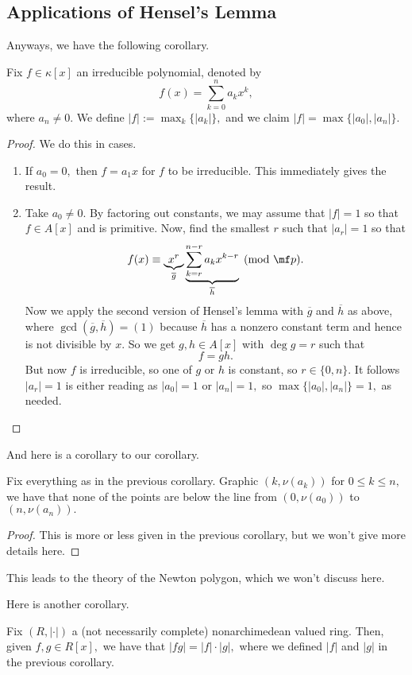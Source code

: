 \subsection{Applications of Hensel's Lemma}
Anyways, we have the following corollary.
\begin{corollary}
	Fix $f\in\kappa[x]$ an irreducible polynomial, denoted by
	\[f(x)=\sum_{k=0}^na_kx^k,\]
	where $a_n\ne0.$ We define $|f|:=\max_k\{|a_k|\},$ and we claim $|f|=\max\{|a_0|,|a_n|\}.$
\end{corollary}
\begin{proof}
	We do this in cases.
	\begin{enumerate}[label=(\roman*)]
		\item If $a_0=0,$ then $f=a_1x$ for $f$ to be irreducible. This immediately gives the result.
		\item Take $a_0\ne0.$ By factoring out constants, we may assume that $|f|=1$ so that $f\in A[x]$ and is primitive. Now, find the smallest $r$ such that $|a_r|=1$ so that
		\[f(x)\equiv \underbrace{x^r}_{\overline g}\underbrace{\sum_{k=r}^{n-r}a_kx^{k-r}}_{\overline h}\pmod{\mf p}.\]
		Now we apply the second version of Hensel's lemma with $\overline g$ and $\overline h$ as above, where $\gcd(\overline g,\overline h)=(1)$ because $\overline h$ has a nonzero constant term and hence is not divisible by $x.$ So we get $g,h\in A[x]$ with $\deg g=r$ such that
		\[f=gh.\]
		But now $f$ is irreducible, so one of $g$ or $h$ is constant, so $r\in\{0,n\}.$ It follows $|a_r|=1$ is either reading as $|a_0|=1$ or $|a_n|=1,$ so $\max\{|a_0|,|a_n|\}=1,$ as needed.
		\qedhere
	\end{enumerate}
\end{proof}
And here is a corollary to our corollary.
\begin{corollary}
	Fix everything as in the previous corollary. Graphic $(k,\nu(a_k))$ for $0\le k\le n,$ we have that none of the points are below the line from $(0,\nu(a_0))$ to $(n,\nu(a_n)).$
\end{corollary}
\begin{proof}
	This is more or less given in the previous corollary, but we won't give more details here.
\end{proof}
\begin{remark}
	This leads to the theory of the Newton polygon, which we won't discuss here.
\end{remark}
Here is another corollary.
\begin{corollary}
	Fix $(R,|\cdot|)$ a (not necessarily complete) nonarchimedean valued ring. Then, given $f,g\in R[x],$ we have that $|fg|=|f|\cdot|g|,$ where we defined $|f|$ and $|g|$ in the previous corollary.
\end{corollary}
